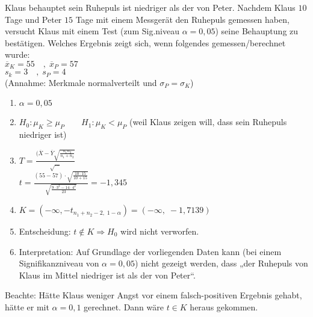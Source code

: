 \documentclass{scrreprt}
\begin{document}
 Klaus behauptet sein Ruhepuls ist niedriger als der von Peter. Nachdem Klaus $10$ Tage und Peter $15$ Tage mit einem Messgerät den Ruhepuls gemessen haben, versucht Klaus mit einem Test (zum Sig.niveau $\alpha = 0,05$) seine Behauptung zu bestätigen. Welches Ergebnis zeigt sich, wenn folgendes gemessen/berechnet wurde:\\
$\overline{x}_K=55\quad, \; \overline{x}_P=57$\\
$s_k = 3 \quad, \; s_P = 4$\\
(Annahme: Merkmale normalverteilt und $\sigma_P=\sigma_K$)
\begin{enumerate}
\item $\alpha = 0,05$
\item $H_0:\mu_K \geq \mu_P \qquad H_1: \mu_K < \mu_P$ (weil Klaus zeigen will, dass sein Ruhepuls niedriger ist)
\item $T=\frac{(\overline{X}-\overline{Y}\sqrt{\frac{n_1 n_2}{n_1+n_2}}}{\sqrt{\dots}}$\\
$t=\frac{(55-57)\cdot \sqrt{\frac{10\cdot 15}{10 + 15}}}{\sqrt{\frac{9\cdot 3^2 - 14 \cdot 4^2}{23}}}=-1,345$
\item $K=(-\infty, -t_{n_1+n_2-2, \; 1-\alpha})=(-\infty, \; - 1,7139)$
\item Entscheidung: $t\not \in K \Rightarrow H_0$ wird nicht verworfen.
\item Interpretation: Auf Grundlage der vorliegenden Daten kann (bei einem Signifikanzniveau von $\alpha=0,05$) nicht gezeigt werden, dass „der Ruhepuls von Klaus im Mittel niedriger ist als der von Peter“.
\end{enumerate}
Beachte: Hätte Klaus weniger Angst vor einem falsch-positiven Ergebnis gehabt, hätte er mit $\alpha=0,1$ gerechnet. Dann wäre $t\in K$ heraus gekommen.
\end{document}
